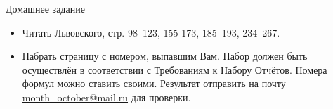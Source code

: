 \documentclass[ mathserif]{beamer}
\begin{document}
%
%
%
\begin{frame}{Домашнее задание}
\begin{itemize}
 \item Читать Львовского, стр. 98--123, 155-173, 185--193, 234--267.
 \item  Набрать страницу с номером, выпавшим Вам. Набор должен быть осуществлён в соответствии с Требованиям к Набору Отчётов. Номера формул можно ставить своими. Результат отправить на почту \url{month_october@mail.ru} для проверки.
\end{itemize}

\end{frame}
\end{document}
